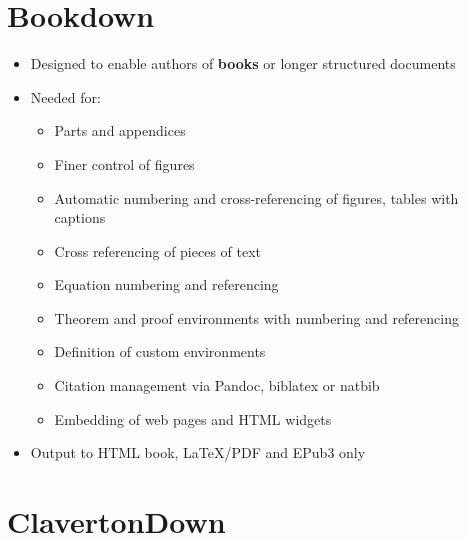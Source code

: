 \documentclass[
  10pt,
  a4paper]{article}
\providecommand{\tightlist}{%
  \setlength{\itemsep}{0pt}\setlength{\parskip}{0pt}}
\begin{document}
\hypertarget{bookdown}{%
\section{Bookdown}\label{bookdown}}

\begin{itemize}
\tightlist
\item
  Designed to enable authors of \textbf{books} or longer structured documents
\item
  Needed for:

  \begin{itemize}
  \tightlist
  \item
    Parts and appendices
  \item
    Finer control of figures
  \item
    Automatic numbering and cross-referencing of figures, tables with captions
  \item
    Cross referencing of pieces of text
  \item
    Equation numbering and referencing
  \item
    Theorem and proof environments with numbering and referencing
  \item
    Definition of custom environments
  \item
    Citation management via Pandoc, biblatex or natbib
  \item
    Embedding of web pages and HTML widgets
  \end{itemize}
\item
  Output to HTML book, LaTeX/PDF and EPub3 only
\end{itemize}

\hypertarget{clavertondown}{%
\section{ClavertonDown}\label{clavertondown}}
\end{document}
